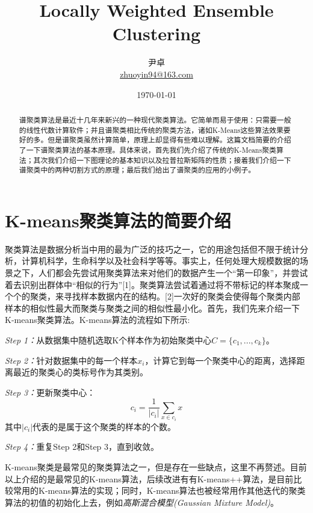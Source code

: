 \documentclass[UTF8, 12pt]{ctexart}
\begin{document}
	\title{\heiti \Huge{Locally Weighted Ensemble Clustering}}
\author{\kaishu 尹卓 \\ \href{mailto:zhuoyin94@163.com}{zhuoyin94@163.com}}
\date{\today}
\maketitle

\tableofcontents
\newpage
\begin{abstract}
	谱聚类算法是最近十几年来新兴的一种现代聚类算法。它简单而易于使用：只需要一般的线性代数计算软件；并且谱聚类相比传统的聚类方法，诸如K-Means这些算法效果要好的多。但是谱聚类虽然计算简单，原理上却显得有些难以理解。这篇文档简要的介绍了一下谱聚类算法的基本原理。具体来说，首先我们先介绍了传统的K-Means聚类算法；其次我们介绍一下图理论的基本知识以及拉普拉斯矩阵的性质；接着我们介绍一下谱聚类中的两种切割方式的原理；最后我们给出了谱聚类的应用的小例子。
\end{abstract}

\section{K-means聚类算法的简要介绍}

聚类算法是数据分析当中用的最为广泛的技巧之一，它的用途包括但不限于统计分析，计算机科学，生命科学以及社会科学等等。事实上，任何处理大规模数据的场景之下，人们都会先尝试用聚类算法来对他们的数据产生一个“第一印象”，并尝试着去识别出群体中“相似的行为”[1]。聚类算法尝试着通过将不带标记的样本聚成一个个的聚类，来寻找样本数据内在的结构。[2]一次好的聚类会使得每个聚类内部样本的相似性最大而聚类与聚类之间的相似性最小化。首先，我们先来介绍一下K-means聚类算法。K-means算法的流程如下所示:

\emph{Step 1：}从数据集中随机选取K个样本作为初始聚类中心$C=\{c_1,...,c_k\}$。

\emph{Step 2：}针对数据集中的每一个样本$x_i$，计算它到每一个聚类中心的距离，选择距离最近的聚类心的类标号作为其类别。

\emph{Step 3：}更新聚类中心：
\begin{equation}
{c_i} = \frac{1}{{|{c_i}|}}\sum\limits_{x \in {c_i}} x
\end{equation}
其中$|{c_i}|$代表的是属于这个聚类的样本的个数。

\emph{Step 4：}重复Step 2和Step 3，直到收敛。

K-means聚类是最常见的聚类算法之一，但是存在一些缺点，这里不再赘述。目前以上介绍的是最常见的K-means算法，后续改进有有K-means++算法，是目前比较常用的K-means算法的实现；同时，K-means算法也被经常用作其他迭代的聚类算法的初值的初始化上去，例如\emph{高斯混合模型(Gaussian Mixture Model)}。
\end{document}

